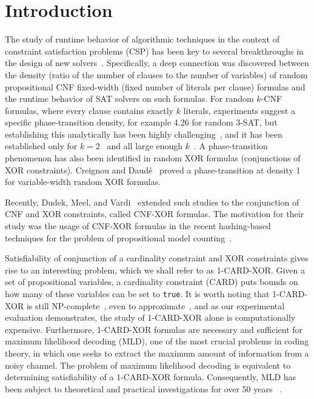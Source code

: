 

\section{Introduction}

The study of runtime behavior of algorithmic techniques in the context of constraint satisfaction problems (CSP) has been key to several breakthroughs in the design of new solvers~\cite{DM94}. Specifically, a deep
connection was discovered between the density (ratio of the number of clauses to the number of variables) of random
propositional CNF fixed-width (fixed number of literals per clause) formulas and the runtime  behavior of SAT solvers on such formulas. 
For random $k$-CNF formulas, where every clause contains exactly $k$ literals, experiments
suggest a specific phase-transition density, for example 4.26 for random 3-SAT,
but establishing this analytically has been highly challenging~\cite{CP13a}, and it has been
established only for $k=2$~\cite{CR92} and all large enough $k$~\cite{DSS15}. 
A phase-transition phenomenon has also been identified in random XOR formulas (conjunctions of 
XOR constraints). 
Creignou and Daud{\'e}~ proved a phase-transition at density 1 for variable-width 
random XOR formulas.

 Recently, Dudek, Meel, and Vardi~ extended such studies to the conjunction of CNF and XOR constraints, called CNF-XOR formulas. The motivation for their study was the usage of CNF-XOR formulas in the recent hashing-based techniques for the problem of propositional model counting~\cite{Stockmeyer83,CMV13b,CMV16,SM19}. 
 
 
 
  
  Satisfiability of  conjunction of a cardinality constraint and XOR constraints gives rise to an interesting problem, which we shall refer to as 1-CARD-XOR. Given a set of propositional variables, a cardinality constraint (CARD) puts  bounds on how many of these variables can be set to {\tt true}.
It is worth noting that 1-CARD-XOR is still NP-complete~\cite{BMT78}, even to approximate~\cite{ABSS93}, and as our experimental evaluation demonstrates, the study of 1-CARD-XOR alone is computationally expensive. Furthermore, 1-CARD-XOR formulas are necessary and sufficient for maximum likelihood decoding (MLD), one of the most crucial problems in coding theory, in which one seeks to extract the maximum amount of information from a noisy channel. The problem of maximum likelihood decoding is equivalent to determining satisfiability of a 1-CARD-XOR formula. Consequently, MLD has been subject to theoretical and practical investigations for over 50 years ~\cite{Chase85,TV15}.

